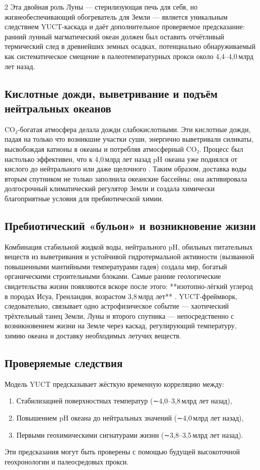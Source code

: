 \documentclass[11pt,a4paper]{article}
\begin{document}
\begin{multicols}{2}
		Эта двойная роль Луны — стерилизующая печь для себя, но жизнеобеспечивающий обогреватель для Земли — является уникальным следствием YUCT-каскада и даёт дополнительное проверяемое предсказание: ранний лунный магматический океан должен был оставить отчётливый термический след в древнейших земных осадках, потенциально обнаруживаемый как систематическое смещение в палеотемпературных прокси около 4,4–4,0 млрд лет назад.
		
		\subsection{Кислотные дожди, выветривание и подъём нейтральных океанов}
		
		CO₂-богатая атмосфера делала дожди слабокислотными. Эти кислотные дожди, падая на только что возникшие участки суши, энергично выветривали силикаты, высвобождая катионы в океаны и потребляя атмосферный CO₂. Процесс был настолько эффективен, что к 4,0 млрд лет назад pH океана уже поднялся от кислого до нейтрального или даже щелочного \cite{KrissansenTotton2019}. Таким образом, доставка воды вторым спутником не только заполнила океанские бассейны; она активировала долгосрочный климатический регулятор Земли и создала химически благоприятные условия для пребиотической химии.
		
		\subsection{Пребиотический «бульон» и возникновение жизни}
		
		Комбинация стабильной жидкой воды, нейтрального pH, обильных питательных веществ из выветривания и устойчивой гидротермальной активности (вызванной повышенными мантийными температурами гадея) создала мир, богатый органическими строительными блоками. Самые ранние геологические свидетельства жизни появляются вскоре после этого: **изотопно-лёгкий углерод в породах Исуа, Гренландия, возрастом 3,8 млрд лет** \cite{Arndt2012}. YUCT-фреймворк, следовательно, связывает одно астрофизическое событие — хаотический трёхтельный танец Земли, Луны и второго спутника — непосредственно с возникновением жизни на Земле через каскад, регулирующий температуру, химию океана и доставку необходимых летучих веществ.
		
		\subsection{Проверяемые следствия}
		
		Модель YUCT предсказывает жёсткую временную корреляцию между:
		\begin{enumerate}
			\item Стабилизацией поверхностных температур (∼4,0–3,8 млрд лет назад),
			\item Повышением pH океана до нейтральных значений (∼4,0 млрд лет назад),
			\item Первыми геохимическими сигнатурами жизни (∼3,8–3,5 млрд лет назад).
		\end{enumerate}
		Эти предсказания могут быть проверены с помощью будущей высокоточной геохронологии и палеосредовых прокси.
	\end{multicols}
	
\end{document}
